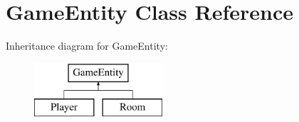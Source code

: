 \hypertarget{class_game_entity}{}\section{Game\+Entity Class Reference}
\label{class_game_entity}
Inheritance diagram for Game\+Entity\+:\begin{figure}[H]
\begin{center}
\leavevmode
\includegraphics[height=2.000000cm]{class_game_entity}
\end{center}
\end{figure}
